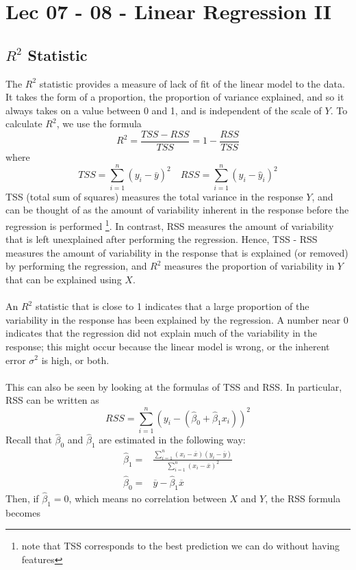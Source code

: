\chapter{Lec 07 - 08 - Linear Regression II}

\section{$R^2$ Statistic}
The $R^2$ statistic provides a measure of lack of fit of the linear model to the data. It takes the form of a proportion, the proportion of variance explained, and so it always takes on a value between 0 and 1, and is independent of the scale of $Y$. To calculate $R^2$, we use the formula
\[R^2 = \frac{TSS - RSS}{TSS} = 1 - \frac{RSS}{TSS}\]
where
\[TSS = \sum_{i=1}^n (y_i - \bar{y})^2 \quad RSS = \sum_{i=1}^n (y_i - \hat{y}_i)^2\]
TSS (total sum of squares) measures the total variance in the response $Y$, and can be  thought of as the amount of variability inherent in the response before the regression is performed \footnote{note that TSS corresponds to the best prediction we can do without having features}. In contrast, RSS measures the amount of variability that is left unexplained after performing the regression. Hence, TSS - RSS measures the amount of variability in the response that is explained (or removed) by performing the regression, and $R^2$ measures the proportion of variability in $Y$ that can be explained using $X$.\\\\
An $R^2$ statistic that is close to 1 indicates that a large proportion of the variability in the response has been explained by the regression. A number near 0 indicates that the
regression did not explain much of the variability in the response; this might occur because the linear model is wrong, or the inherent error $\sigma^2$ is high, or both.\\\\
This can also be seen by looking at the formulas of TSS and RSS. In particular, RSS can be written as
\[RSS = \sum_{i=1}^n (y_i - (\hat\beta_0 + \hat\beta_1 x_i))^2\]
Recall that $\hat\beta_0$ and $\hat\beta_1$ are estimated in the following way:
\[
\begin{split}
    \hat{\beta}_1 = & \frac{\sum_{i=1}^n (x_i - \overline{x}) (y_i - \overline{y})}{\sum_{i=1}^n (x_i - \overline{x})^2} \\
    \hat{\beta}_0 = & \overline{y} - \hat{\beta}_1 \overline{x}
\end{split}
\]
Then, if $\hat\beta_1 = 0$, which means no correlation between $X$ and $Y$, the RSS formula becomes
